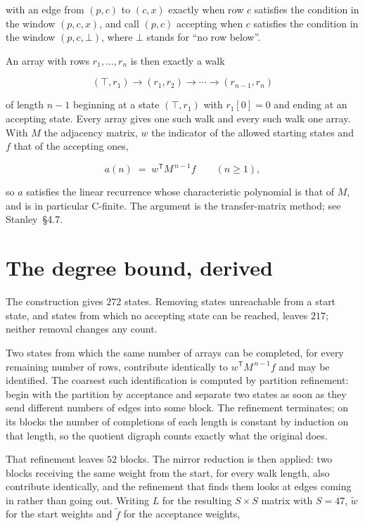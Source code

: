 \documentclass[11pt]{article}
\theoremstyle{definition}
\begin{document}
with an edge from $(p,c)$ to $(c,x)$ exactly when row $c$ satisfies the condition in the window $(p,c,x)$, and call $(p,c)$ accepting when $c$ satisfies the condition in the window $(p,c,\bot)$, where $\bot$ stands for ``no row below''.

An array with rows $r_1,\dots,r_n$ is then exactly a walk

\[(\top,r_1) \to (r_1,r_2) \to \cdots \to (r_{n-1},r_n)\]

of length $n-1$ beginning at a state $(\top,r_1)$ with $r_1[0]=0$ and ending at an accepting state. Every array gives one such walk and every such walk one array. With $M$ the adjacency matrix, $w$ the indicator of the allowed starting states and $f$ that of the accepting ones,

\[a(n) \;=\; w^{\mathsf T} M^{\,n-1} f \qquad (n \ge 1),\]

so $a$ satisfies the linear recurrence whose characteristic polynomial is that of $M$, and is in particular C-finite. The argument is the transfer-matrix method; see Stanley~\S4.7.

\section{The degree bound, derived}

The construction gives $272$ states. Removing states unreachable from a start state, and states from which no accepting state can be reached, leaves $217$; neither removal changes any count.

Two states from which the same number of arrays can be completed, for every remaining number of rows, contribute identically to $w^{\mathsf T}M^{\,n-1}f$ and may be identified. The coarsest such identification is computed by partition refinement: begin with the partition by acceptance and separate two states as soon as they send different numbers of edges into some block. The refinement terminates; on its blocks the number of completions of each length is constant by induction on that length, so the quotient digraph counts exactly what the original does.

That refinement leaves $52$ blocks. The mirror reduction is then applied: two blocks receiving the same weight from the start, for every walk length, also contribute identically, and the refinement that finds them looks at edges coming in rather than going out. Writing $L$ for the resulting $S \times S$ matrix with $S = 47$, $\tilde w$ for the start weights and $\tilde f$ for the acceptance weights,
\end{document}
